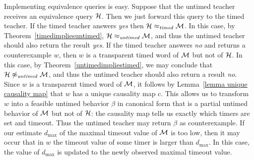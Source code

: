 Implementing equivalence queries is easy.
Suppose that the untimed teacher receives an equivalence query ${\mathcal H}$.
Then we just forward this query to the timed teacher.
If the timed teacher answers \emph{yes} then ${\mathcal H} \approx_{\mathit{timed}} {\mathcal M}$.
In this case, by Theorem~\ref{timedimpliesuntimed}, ${\mathcal H} \approx_{\mathit{untimed}} {\mathcal M}$,
and thus the untimed teacher should also return the result \emph{yes}.
If the timed teacher answers \emph{no} and returns a counterexample $w$,
then $w$ is a transparent timed word of ${\mathcal M}$ but not of ${\mathcal H}$.
In this case, by Theorem~\ref{untimedimpliestimed}, we may conclude that
${\mathcal H} \not\approx_{\mathit{untimed}} {\mathcal M}$, and thus the untimed teacher should also return a result \emph{no}.
Since $w$ is a transparent timed word of ${\mathcal M}$, it 
follows by Lemma~\ref{lemma unique causality map} that $w$ 
has a unique causality map $c$.
This allows us to transform $w$ into a feasible untimed behavior $\beta$ in canonical form that is a partial untimed
behavior of ${\mathcal M}$ but not of ${\mathcal H}$: the causality map tells us exactly which timers are set and timeout. 
Thus the untimed teacher may return $\beta$ as counterexample.
If our estimate $d_{\max}$ of the maximal timeout value of ${\mathcal M}$ is too low, then it may occur that in $w$ the timeout value of some
timer is larger than $d_{\max}$. In this case, the value of $d_{\max}$ is updated to the newly observed maximal timeout value.





